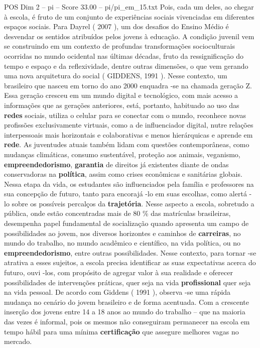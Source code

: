 \begin{textsample}{POS Dim 2 – pi – Score 33.00 – pi/pi\_em\_15.txt}
Pois, cada um deles, ao chegar à escola, é fruto de um conjunto de experiências sociais vivenciadas em diferentes espaços sociais.
Para Dayrel ( 2007 ), um dos desafios do Ensino Médio é desvendar os sentidos atribuídos pelos jovens à educação.
A condição juvenil vem se construindo em um contexto de profundas transformações socioculturais ocorridas no mundo ocidental nas últimas décadas, fruto da ressignificação do tempo e espaço e da reflexividade, dentre outras dimensões, o que vem gerando uma nova arquitetura do social ( GIDDENS, 1991 ).
Nesse contexto, um brasileiro que nasceu em torno do ano 2000 enquadra -se na chamada geração Z.
Essa geração cresceu em um mundo digital e tecnológico, com mais acesso a informações que as gerações anteriores, está, portanto, habituado ao uso das \textbf{redes} sociais, utiliza o celular para se conectar com o mundo, reconhece novas profissões exclusivamente virtuais, como a de influenciador digital, nutre relações interpessoais mais horizontais e colaborativas e menos hierárquicas e aprende em \textbf{rede}.
As juventudes atuais também lidam com questões contemporâneas, como mudanças climáticas, consumo sustentável, proteção aos animais, veganismo, \textbf{empreendedorismo}, \textbf{garantia} de direitos já existentes diante de ondas conservadoras na \textbf{política}, assim como crises econômicas e sanitárias globais.
Nessa etapa da vida, os estudantes são influenciados pela família e professores na sua concepção de futuro, tanto para encorajá -lo em suas escolhas, como alertá -lo sobre os possíveis percalços da \textbf{trajetória}.
Nesse aspecto a escola, sobretudo a pública, onde estão concentradas mais de 80 \% das matrículas brasileiras, desempenha papel fundamental de socialização quando apresenta um campo de possibilidades ao jovem, nos diversos horizontes e caminhos de \textbf{carreiras}, no mundo do trabalho, no mundo acadêmico e científico, na vida política, ou no \textbf{empreendedorismo}, entre outras possibilidades.
Nesse contexto, para tornar -se atrativa a esses sujeitos, a escola precisa identificar as suas expectativas acerca do futuro, ouvi -los, com propósito de agregar valor à sua realidade e oferecer possibilidades de intervenções práticas, quer seja na vida \textbf{profissional} quer seja na vida pessoal.
De acordo com Giddens ( 1991 ), observa -se uma rápida mudança no cenário do jovem brasileiro e de forma acentuada.
Com a crescente inserção dos jovens entre 14 a 18 anos ao mundo do trabalho – que na maioria das vezes é informal, pois os mesmos não conseguiram permanecer na escola em tempo hábil para uma mínima \textbf{certificação} que assegure melhores vagas no mercado.

\end{textsample}
